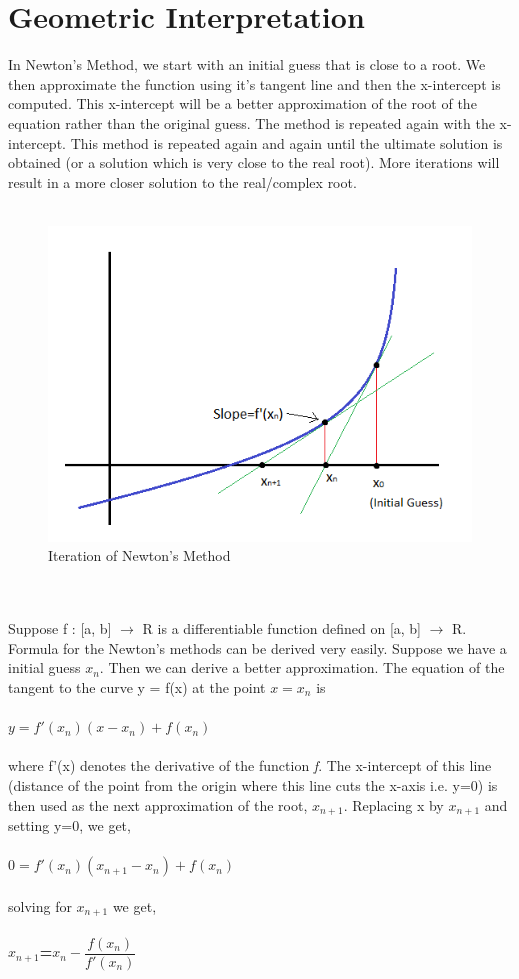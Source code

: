 \documentclass[15pt]{report}
\begin{document}
\section*{Geometric Interpretation}
In Newton's Method, we start with an initial guess that is close to a root. We then approximate the function using it's tangent line and then the x-intercept is computed. This x-intercept will be a better approximation of the root of the equation rather than the original guess. The method is repeated again with the x-intercept. This method is repeated again and again until the ultimate solution is obtained (or a solution which is very close to the real root). More iterations will result in a more closer solution to the real/complex root.  \\ \\
\begin{figure}[h]
\centering
\includegraphics[width=1 \columnwidth]{1}
\caption{Iteration of Newton's Method}
\end{figure}\\ \\
Suppose f : [a, b] $\rightarrow$ R is a differentiable function defined on [a, b] $\rightarrow$ R. Formula for the Newton's methods can be derived very easily. Suppose we have a initial guess $x_{n}$. Then we can derive a better approximation. The equation of the tangent to the curve y = f(x) at the point $x=x_{n}$ is\\ \\
{\textbf{\Large $y=f'(x_{n})(x-x_{n})+f(x_{n})$}}\\ \\
where f'(x) denotes the derivative of the function \textit{f}.
The x-intercept of this line (distance of the point from the origin where this line cuts the x-axis i.e. y=0) is then used as the next approximation of the root, $x_{n+1}$. Replacing x by $x_{n+1}$ and setting y=0, we get,\\ \\
{\textbf{\Large $0=f'(x_{n})(x_{n+1}-x_{n})+f(x_{n})$}}\\ \\
solving for $x_{n+1}$ we get,\\ \\
{\textbf{\Large $x_{n+1}$=$x_{n}-\dfrac{f(x_{n})}{f'(x_{n})}$}}\\ \\
\end{document}
